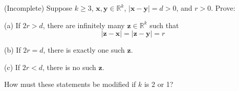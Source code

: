 \documentclass[12pt]{article}
\newenvironment{problem}[2][Problem]{\begin{trivlist}
\item[\hskip \labelsep {\bfseries #1}\hskip \labelsep {\bfseries #2.}]}{\end{trivlist}}
\begin{document}
\begin{problem}{9}

\end{problem}
\begin{problem}{10}

\end{problem}
\begin{problem}{11}

\end{problem}
\begin{problem}{12}

\end{problem}
\begin{problem}{13}

\end{problem}
\begin{problem}{14}

\end{problem}
\begin{problem}{15}

\end{problem}
\begin{problem}{16}
(Incomplete) Suppose $k \geq 3$, $\mathbf{x},\mathbf{y} \in \mathbb{R}^k$, $|\mathbf{x}-\mathbf{y}| = d > 0$, and $r > 0$.  Prove:

(a) If $2r > d$, there are infinitely many $\mathbf{z}\in \mathbb{R}^k$ such that
\begin{equation}
|\mathbf{z} - \mathbf{x}| = |\mathbf{z} - \mathbf{y}| = r
\end{equation}

(b) If $2r = d$, there is exactly one such $\mathbf{z}$.

(c) If $2r < d$, there is no such $\mathbf{z}$.

How must these statements be modified if $k$ is 2 or 1?
\end{problem}
\end{document}

